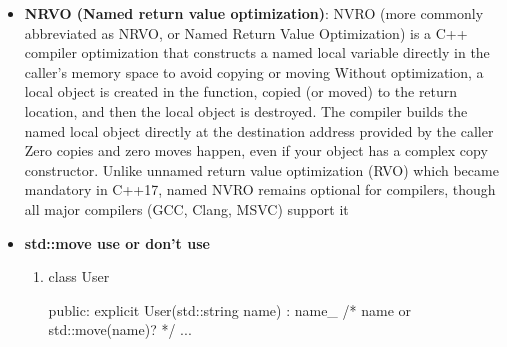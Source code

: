 \documentclass{report}
\begin{document}
\begin{itemize}
\begin{cppcode}
{                    // Marked as explicit conversion to bool
                    explicit operator bool() const {
                        return isValid();
                    }
                };

                int main() {
                    SmartPointer ptr;

                    // Okay, loops and conditions are explicit contexts
                    if (ptr) { ... }

                    // Error
                    int x = ptr + 5;
                }
            \end{cppcode}
            \bigbreak \noindent 
            Prior to C++11, explicit was only meaningful for single-argument constructors. With the introduction of braced init-lists ({}), constructors with multiple arguments can also participate in implicit conversions, meaning they should often be marked explicit too
            \bigbreak \noindent 
            explicit by default unless you have an intentional architectural reason to allow implicit conversions (e.g., a custom String class allowing literal const char* conversions). 
            \bigbreak \noindent 
            If you separate your class implementation, the explicit keyword goes only on the declaration inside the class header file, not on the definition
        \item \textbf{NRVO (Named return value optimization)}: NVRO (more commonly abbreviated as NRVO, or Named Return Value Optimization) is a C++ compiler optimization that constructs a named local variable directly in the caller's memory space to avoid copying or moving
            \bigbreak \noindent 
            Without optimization, a local object is created in the function, copied (or moved) to the return location, and then the local object is destroyed.  The compiler builds the named local object directly at the destination address provided by the caller
            \bigbreak \noindent 
            Zero copies and zero moves happen, even if your object has a complex copy constructor. Unlike unnamed return value optimization (RVO) which became mandatory in C++17, named NVRO remains optional for compilers, though all major compilers (GCC, Clang, MSVC) support it
        \item \textbf{std::move use or don't use}
            \begin{enumerate}
                \item 
                    \bigbreak \noindent 
                    \begin{cppcode}
                        class User {
                        public:
                            explicit User(std::string name)
                                : name_{ /* name or std::move(name)? */ } { ... }

}
\end{cppcode}
\end{enumerate}
\end{itemize}
\end{document}

